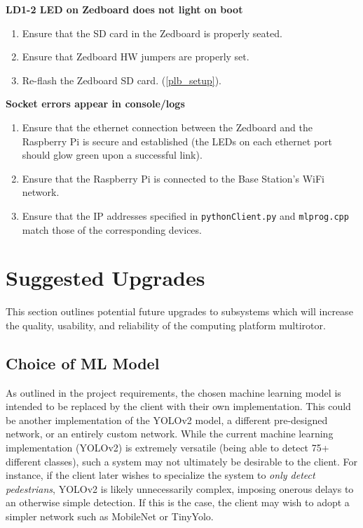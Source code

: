 \documentclass[10pt,letterpaper]{article}
\begin{document}
\textbf{LD1-2 LED on Zedboard does not light on boot}
\begin{enumerate}
\item Ensure that the SD card in the Zedboard is properly seated.
\item Ensure that Zedboard HW jumpers are properly set.
\item Re-flash the Zedboard SD card. (\ref{plb_setup}).
\end{enumerate}

\textbf{Socket errors appear in console/logs}
\begin{enumerate}
\item Ensure that the ethernet connection between the Zedboard and the Raspberry Pi is secure and established (the LEDs on each ethernet port should glow green upon a successful link).
\item Ensure that the Raspberry Pi is connected to the Base Station's WiFi network.
\item Ensure that the IP addresses specified in \texttt{pythonClient.py} and \texttt{mlprog.cpp} match those of the corresponding devices.
\end{enumerate}

\clearpage
\section{Suggested Upgrades}
This section outlines potential future upgrades to subsystems which will increase the quality, usability, and reliability of the computing platform multirotor. 

\subsection{Choice of ML Model}
As outlined in the project requirements, the chosen machine learning model is intended to be replaced by the client with their own implementation. This could be another implementation of the YOLOv2 model, a different pre-designed network, or an entirely custom network. While the current machine learning implementation (YOLOv2) is extremely versatile (being able to detect 75+ different classes), such a system may not ultimately be desirable to the client. For instance, if the client later wishes to specialize the system to \textit{only detect pedestrians}, YOLOv2 is likely unnecessarily complex, imposing onerous delays to an otherwise simple detection. If this is the case, the client may wish to adopt a simpler network such as MobileNet or TinyYolo.
\end{document}
